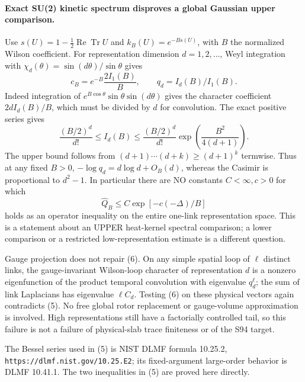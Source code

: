 \documentclass[11pt]{article}
\begin{document}
\paragraph{Exact SU(2) kinetic spectrum disproves a global Gaussian upper comparison.}
Use $s(U)=1-\tfrac12\operatorname{Re}\operatorname{Tr}U$ and
$k_B(U)=e^{-Bs(U)}$, with $B$ the normalized Wilson coefficient. For representation
dimension $d=1,2,\ldots$, Weyl integration with
$\chi_d(\theta)=\sin(d\theta)/\sin\theta$ gives
\[
 c_B=e^{-B}\frac{2I_1(B)}B,\qquad q_d=I_d(B)/I_1(B).    \tag{4}
\]
Indeed integration of $e^{B\cos\theta}\sin\theta\sin(d\theta)$ gives the
character coefficient $2d I_d(B)/B$, which must be divided by $d$ for convolution.
The exact positive series gives
\[
 \frac{(B/2)^d}{d!}\le I_d(B)
 \le\frac{(B/2)^d}{d!}\exp\left(\frac{B^2}{4(d+1)}\right). \tag{5}
\]
The upper bound follows from $(d+1)\cdots(d+k)\ge(d+1)^k$ termwise.
Thus at any fixed $B>0$, $-\log q_d=d\log d+O_B(d)$, whereas the Casimir is
proportional to $d^2-1$. In particular there are NO constants $C<\infty,c>0$
for which
\[
 \widehat Q_B\le C\exp[-c(-\Delta)/B]                  \tag{6}
\]
holds as an operator inequality on the entire one-link representation space.
This is a statement about an UPPER heat-kernel spectral comparison; a lower
comparison or a restricted low-representation estimate is a different question.

Gauge projection does not repair (6). On any simple spatial loop of $\ell$ distinct
links, the gauge-invariant Wilson-loop character of representation $d$ is a
nonzero eigenfunction of the product temporal convolution with eigenvalue
$q_d^\ell$; the sum of link Laplacians has eigenvalue $\ell C_d$.
Testing (6) on these physical vectors again contradicts (5). No free global
rotor replacement or gauge-volume approximation is involved. High representations
still have a factorially controlled tail, so this failure is not a failure of
physical-slab trace finiteness or of the S94 target.

The Bessel series used in (5) is NIST DLMF formula 10.25.2,
\texttt{https://dlmf.nist.gov/10.25.E2}; its fixed-argument large-order behavior
is DLMF 10.41.1. The two inequalities in (5) are proved here directly.
\end{document}

